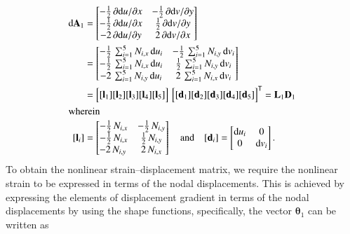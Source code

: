 \begin{subequations}
	\begin{align}
	\mathrm{d} \mathbf{A}_1 & =  \begin{bmatrix}
	-\tfrac{1}{2} \, \partial \mathrm{d} u / \partial x &  - \tfrac{1}{2} \, \partial \mathrm{d} v / \partial y \\
	-\tfrac{1}{2} \, \partial \mathrm{d} u / \partial x &  \tfrac{1}{2} \, \partial \mathrm{d} v / \partial y \\
	-2 \, \partial \mathrm{d} u / \partial y  & 2 \, \partial \mathrm{d} v / \partial x  \end{bmatrix} \notag \\
	& = \begin{bmatrix}
	-\tfrac{1}{2} \, \sum\nolimits_{i=1}^5 N_{i,x} \, \mathrm{d} u_i &  - \tfrac{1}{2} \, \sum\nolimits_{i=1}^5 N_{i,y} \, \mathrm{d} v_i \\
	-\tfrac{1}{2} \, \sum\nolimits_{i=1}^5 N_{i,x} \, \mathrm{d} u_i &  \tfrac{1}{2} \, \sum\nolimits_{i=1}^5 N_{i,y} \, \mathrm{d} v_i \\
	-2 \, \sum\nolimits_{i=1}^5 N_{i,y} \, \mathrm{d} u_i  & 2 \, \sum\nolimits_{i=1}^5 N_{i,x} \, \mathrm{d} v_i  \end{bmatrix}\notag \\
	& = \begin{bmatrix}
	[\mathbf{l}_1] [\mathbf{l}_2] [\mathbf{l}_3] [\mathbf{l}_4] [\mathbf{l}_5] 
	\end{bmatrix} \, \begin{bmatrix} [\mathbf{d}_1] [\mathbf{d}_2] [\mathbf{d}_3] [\mathbf{d}_4] [\mathbf{d}_5] \end{bmatrix}^{\mathsf{T}}
	= \mathbf{L}_1 \mathbf{D}_1 \\
	\intertext{wherein}
	[\mathbf{l}_i] & = \begin{bmatrix}
	-\tfrac{1}{2} \, N_{i,x} &  - \tfrac{1}{2} \, N_{i,y} \\
	-\tfrac{1}{2} \, N_{i,x} &  \tfrac{1}{2} \, N_{i,y} \\
	-2 \, N_{i,y} \, & 2 \, N_{i,x} \end{bmatrix}  \quad \text{and} \quad	[\mathbf{d}_i] = \begin{bmatrix}
	\mathrm{d} u_i & 0 \\
	0 &  \mathrm{d} v_i  \end{bmatrix} .
	\end{align}
\end{subequations}
To obtain the nonlinear strain--displacement matrix, we require the nonlinear strain to be expressed in terms of the nodal displacements. This is achieved by expressing the elements of displacement gradient in terms of the nodal displacements by using the shape functions, specifically, the vector $\boldsymbol{\theta}_1$ can be written as
